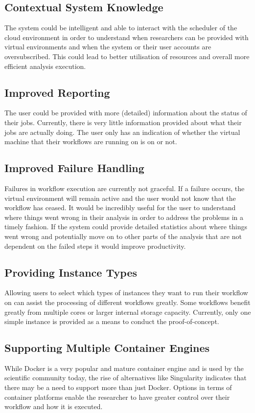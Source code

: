 \subsection{Contextual System Knowledge}
The system could be intelligent and able to interact with the scheduler of the cloud environment in order to understand when researchers can be provided with virtual environments and when the system or their user accounts are oversubscribed. This could lead to better utilisation of resources and overall more efficient analysis execution.

\subsection{Improved Reporting}
The user could be provided with more (detailed) information about the status of their jobs. Currently, there is very little information provided about what their jobs are actually doing. The user only has an indication of whether the virtual machine that their workflows are running on is on or not.

\subsection{Improved Failure Handling}
Failures in workflow execution are currently not graceful. If a failure occurs, the virtual environment will remain active and the user would not know that the workflow has ceased. It would be incredibly useful for the user to understand where things went wrong in their analysis in order to address the problems in a timely fashion. If the system could provide detailed statistics about where things went wrong and potentially move on to other parts of the analysis that are not dependent on the failed steps it would improve productivity.

\subsection{Providing Instance Types}
Allowing users to select which types of instances they want to run their workflow on can assist the processing of different workflows greatly. Some workflows benefit greatly from multiple cores or larger internal storage capacity. Currently, only one simple instance is provided as a means to conduct the proof-of-concept.

\subsection{Supporting Multiple Container Engines}
While Docker is a very popular and mature container engine and is used by the scientific community today, the rise of alternatives like Singularity indicates that there may be a need to support more than just Docker. Options in terms of container platforms enable the researcher to have greater control over their workflow and how it is executed.


